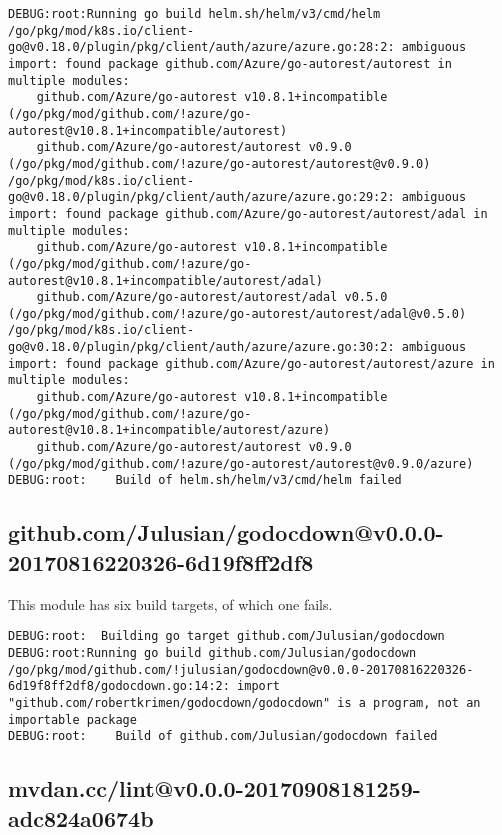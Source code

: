 \documentclass[a4paper]{paper}
\begin{document}
\begin{verbatim}
DEBUG:root:Running go build helm.sh/helm/v3/cmd/helm
/go/pkg/mod/k8s.io/client-go@v0.18.0/plugin/pkg/client/auth/azure/azure.go:28:2: ambiguous import: found package github.com/Azure/go-autorest/autorest in multiple modules:
	github.com/Azure/go-autorest v10.8.1+incompatible (/go/pkg/mod/github.com/!azure/go-autorest@v10.8.1+incompatible/autorest)
	github.com/Azure/go-autorest/autorest v0.9.0 (/go/pkg/mod/github.com/!azure/go-autorest/autorest@v0.9.0)
/go/pkg/mod/k8s.io/client-go@v0.18.0/plugin/pkg/client/auth/azure/azure.go:29:2: ambiguous import: found package github.com/Azure/go-autorest/autorest/adal in multiple modules:
	github.com/Azure/go-autorest v10.8.1+incompatible (/go/pkg/mod/github.com/!azure/go-autorest@v10.8.1+incompatible/autorest/adal)
	github.com/Azure/go-autorest/autorest/adal v0.5.0 (/go/pkg/mod/github.com/!azure/go-autorest/autorest/adal@v0.5.0)
/go/pkg/mod/k8s.io/client-go@v0.18.0/plugin/pkg/client/auth/azure/azure.go:30:2: ambiguous import: found package github.com/Azure/go-autorest/autorest/azure in multiple modules:
	github.com/Azure/go-autorest v10.8.1+incompatible (/go/pkg/mod/github.com/!azure/go-autorest@v10.8.1+incompatible/autorest/azure)
	github.com/Azure/go-autorest/autorest v0.9.0 (/go/pkg/mod/github.com/!azure/go-autorest/autorest@v0.9.0/azure)
DEBUG:root:    Build of helm.sh/helm/v3/cmd/helm failed
\end{verbatim}

\subsection{github.com/Julusian/godocdown@v0.0.0-20170816220326-6d19f8ff2df8}

This module has six build targets, of which one fails.

\begin{verbatim}
DEBUG:root:  Building go target github.com/Julusian/godocdown
DEBUG:root:Running go build github.com/Julusian/godocdown
/go/pkg/mod/github.com/!julusian/godocdown@v0.0.0-20170816220326-6d19f8ff2df8/godocdown.go:14:2: import "github.com/robertkrimen/godocdown/godocdown" is a program, not an importable package
DEBUG:root:    Build of github.com/Julusian/godocdown failed
\end{verbatim}


\subsection{mvdan.cc/lint@v0.0.0-20170908181259-adc824a0674b}
\end{document}
